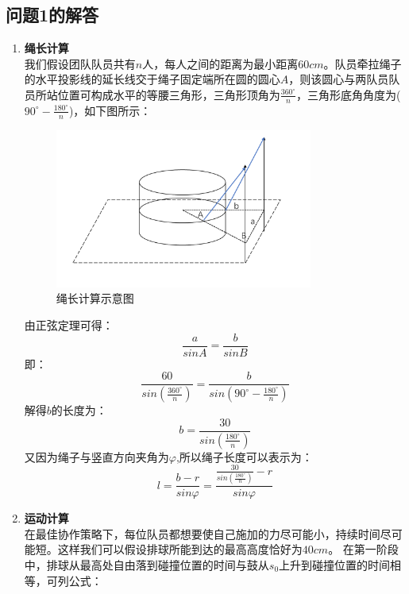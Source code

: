 \documentclass{cumcm}
\begin{document}
\subsection{问题1的解答}
\begin{enumerate}
\item \textbf{绳长计算}\\
我们假设团队队员共有$n$人，每人之间的距离为最小距离$60cm$。队员牵拉绳子的水平投影线的延长线交于绳子固定端所在圆的圆心$A$，则该圆心与两队员队员所站位置可构成水平的等腰三角形，三角形顶角为$\frac{360^{\circ}}{n}$，三角形底角角度为($90^{\circ}-\frac{180^{\circ}}{n}$)，如下图所示：
\begin{figure}[H]
\centering
\includegraphics[width=0.8\textwidth]{img/string.pdf}
\caption{绳长计算示意图}
\end{figure}
由正弦定理可得：
\begin{displaymath}
\frac{a}{sinA}=\frac{b}{sinB}
\end{displaymath}
即：
\begin{displaymath}
\frac{60}{sin({\frac{360^{\circ}}{n}})}=\frac{b}{sin({90^{\circ}-\frac{180^{\circ}}{n}})}
\end{displaymath}
解得$b$的长度为：
\begin{displaymath}
b=\frac{30}{sin( \frac{180^{\circ}}{n})}
\end{displaymath}
又因为绳子与竖直方向夹角为$\varphi$,所以绳子长度可以表示为：
\begin{equation}
l=\frac{b-r}{sin\varphi}=\frac{\frac{30}{sin(\frac{180^{\circ}}{n})}-r}{sin\varphi}
\end{equation}
\item \textbf{运动计算}\\
在最佳协作策略下，每位队员都想要使自己施加的力尽可能小，持续时间尽可能短。这样我们可以假设排球所能到达的最高高度恰好为$40cm$。
在第一阶段中，排球从最高处自由落到碰撞位置的时间与鼓从$s_0$上升到碰撞位置的时间相等，可列公式：

\end{enumerate}
\end{document}
